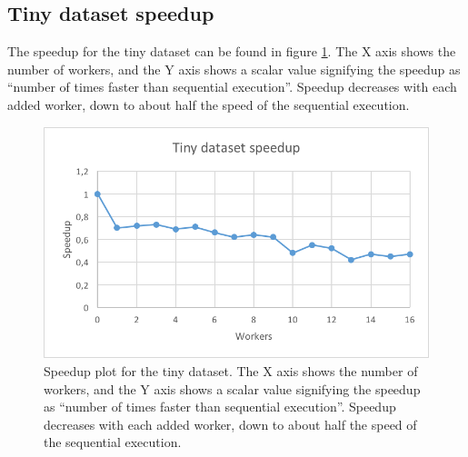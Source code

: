 \subsection{Tiny dataset speedup}
The speedup for the tiny dataset can be found in figure \ref{fig:dataset_1_speedup}.
The X axis shows the number of workers, and the Y axis shows a scalar value signifying the speedup as
``number of times faster than sequential execution''. Speedup decreases with each added worker, down to about half the speed of the sequential execution.
\begin{figure}[ht]
  \centering
  \includegraphics[width=120mm]{figures/dataset_1/dataset_1_speedup.png}
  \caption[Speedup plot for tiny dataset.]{Speedup plot for the tiny dataset. The X axis shows the number of workers, and the Y axis shows a scalar value signifying the speedup as
  ``number of times faster than sequential execution''. Speedup decreases with each added worker, down to about half the speed of the sequential execution.}
  \label{fig:dataset_1_speedup}
\end{figure}

